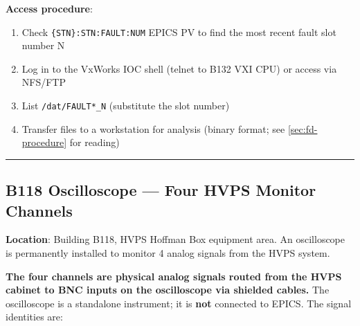 \textbf{Access procedure}:

\begin{enumerate}
\def\labelenumi{\arabic{enumi}.}
\tightlist
\item
  Check \texttt{\{STN\}:\allowbreak{}STN:\allowbreak{}FAULT:\allowbreak{}NUM} EPICS PV to find the most recent fault slot number N
\item
  Log in to the VxWorks IOC shell (telnet to B132 VXI CPU) or access via NFS/FTP
\item
  List \texttt{/dat/FAULT*\_N} (substitute the slot number)
\item
  Transfer files to a workstation for analysis (binary format; see \cref{sec:fd-procedure} for reading)
\end{enumerate}

\begin{center}\rule{0.5\linewidth}{0.5pt}\end{center}

\subsection{B118 Oscilloscope --- Four HVPS Monitor Channels}\label{sec:fd-scope}


\textbf{Location}: Building B118, HVPS Hoffman Box equipment area. An oscilloscope is permanently installed to monitor 4 analog signals from the HVPS system.

\textbf{The four channels are physical analog signals routed from the HVPS cabinet to BNC inputs on the oscilloscope via shielded cables.} The oscilloscope is a standalone instrument; it is \textbf{not} connected to EPICS. The signal identities are:

